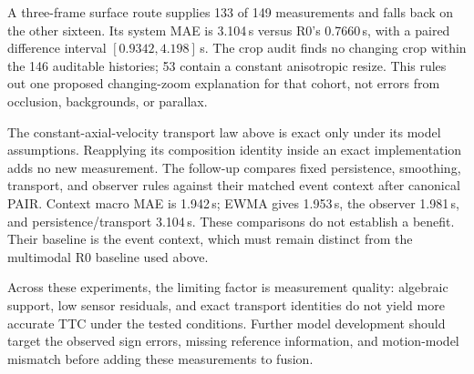 A three-frame surface route supplies 133 of 149 measurements and falls back on the other sixteen. Its system MAE is 3.104\,s versus R0's 0.7660\,s, with a paired difference interval $[0.9342,4.198]$\,s. The crop audit finds no changing crop within the 146 auditable histories; 53 contain a constant anisotropic resize. This rules out one proposed changing-zoom explanation for that cohort, not errors from occlusion, backgrounds, or parallax.

The constant-axial-velocity transport law above is exact only under its model assumptions. Reapplying its composition identity inside an exact implementation adds no new measurement. The follow-up compares fixed persistence, smoothing, transport, and observer rules against their matched event context after canonical PAIR. Context macro MAE is 1.942\,s; EWMA gives 1.953\,s, the observer 1.981\,s, and persistence/transport 3.104\,s. These comparisons do not establish a benefit. Their baseline is the event context, which must remain distinct from the multimodal R0 baseline used above.

Across these experiments, the limiting factor is measurement quality: algebraic support, low sensor residuals, and exact transport identities do not yield more accurate TTC under the tested conditions. Further model development should target the observed sign errors, missing reference information, and motion-model mismatch before adding these measurements to fusion.
\FloatBarrier
